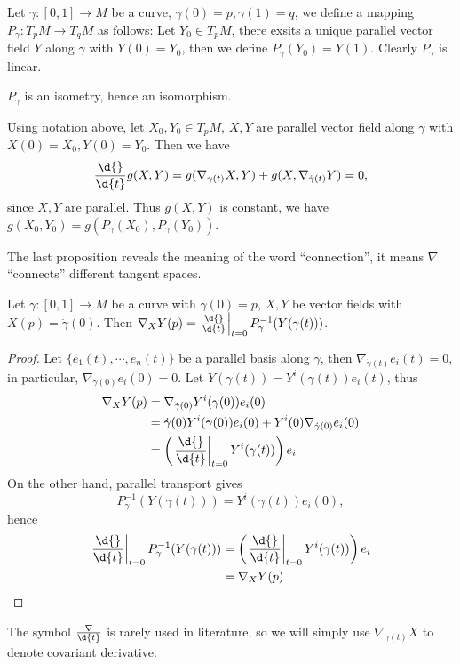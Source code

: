 \begin{defn}
    Let $\gamma:[0,1]\to M$ be a curve, $\gamma(0)=p,\gamma(1)=q$, we define a mapping $P_\gamma:T_pM\to T_qM$ as follows:
    Let $Y_0\in T_pM$, there exsits a unique parallel vector field $Y$ along $\gamma$ with $Y(0)=Y_0$, then we define $P_\gamma(Y_0)=Y(1)$.
    Clearly $P_\gamma$ is linear.
\end{defn}

\begin{prop}
    $P_\gamma$ is an isometry, hence an isomorphism.
\end{prop}
\begin{prop}
    Using notation above, let $X_0,Y_0\in T_pM$, $X,Y$ are parallel vector field along $\gamma$ with $X(0)=X_0,Y(0)=Y_0$.
    Then we have
    \[\frac{\d{}}{\d{t}}g(X,Y)=g(\nabla_{\dot{\gamma}(t)}X,Y)+g(X,\nabla_{\dot{\gamma}(t)}Y)=0,\]
    since $X,Y$ are parallel.
    Thus $g(X,Y)$ is constant, we have $g(X_0,Y_0)=g(P_\gamma(X_0),P_\gamma(Y_0))$.
\end{prop}

The last proposition reveals the meaning of the word ``connection'', it means $\nabla$ ``connects'' different tangent spaces.
\begin{prop}
    Let $\gamma:[0,1]\to M$ be a curve with $\gamma(0)=p$, $X,Y$ be vector fields with $X(p)=\dot{\gamma}(0)$.
    Then $\nabla_XY(p)=\left.\frac{\d{}}{\d{t}}\right|_{t=0}P^{-1}_\gamma(Y(\gamma(t)))$.
\end{prop}
\begin{proof}
    Let $\{e_1(t),\cdots,e_n(t)\}$ be a parallel basis along $\gamma$, then $\nabla_{\dot{\gamma}(t)}e_i(t)=0$, in particular, $\nabla_{\dot{\gamma}(0)}e_i(0)=0$.
    Let $Y(\gamma(t))=Y^i(\gamma(t))e_i(t)$, thus
    \begin{align*}
        \nabla_XY(p)&=\nabla_{\dot{\gamma}(0)}Y^i(\gamma(0))e_i(0)\\
        &=\dot{\gamma}(0)Y^i(\gamma(0))e_i(0)+Y^i(0)\nabla_{\dot{\gamma}(0)}e_i(0)\\
        &=\left(\left.\frac{\d{}}{\d{t}}\right|_{t=0}Y^i(\gamma(t))\right)e_i
    \end{align*}
    On the other hand, parallel transport gives
    \[P^{-1}_{\gamma}(Y(\gamma(t)))=Y^i(\gamma(t))e_i(0),\]
    hence
    \begin{align*}
        \left.\frac{\d{}}{\d{t}}\right|_{t=0}P^{-1}_\gamma(Y(\gamma(t)))&=\left(\left.\frac{\d{}}{\d{t}}\right|_{t=0}Y^i(\gamma(t))\right)e_i\\
        &=\nabla_XY(p)\qedhere
    \end{align*}
\end{proof}

\begin{rem}
    The symbol $\frac{\nabla}{\d{t}}$ is rarely used in literature, so we will simply use $\nabla_{\dot{\gamma}(t)}X$ to denote covariant derivative.
\end{rem}